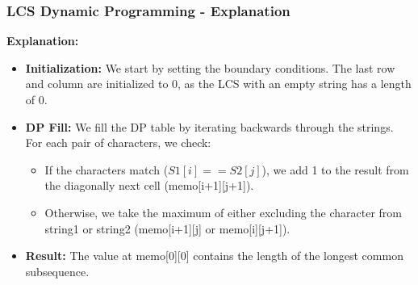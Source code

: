 \documentclass[10pt,aspectratio=43]{beamer}
\begin{document}
\begin{frame}
    \frametitle{LCS Dynamic Programming - Explanation}
    \textbf{Explanation:}
    
    \begin{itemize}
        \item \textbf{Initialization:} We start by setting the boundary conditions. The last row and column are initialized to 0, as the LCS with an empty string has a length of 0.
        \item \textbf{DP Fill:} We fill the DP table by iterating backwards through the strings. For each pair of characters, we check:
            \begin{itemize}
                \item If the characters match ($S1[i] == S2[j]$), we add 1 to the result from the diagonally next cell (memo[i+1][j+1]).
                \item Otherwise, we take the maximum of either excluding the character from string1 or string2 (memo[i+1][j] or memo[i][j+1]).
            \end{itemize}
        \item \textbf{Result:} The value at memo[0][0] contains the length of the longest common subsequence.
    \end{itemize}
\end{frame}
\end{document}
